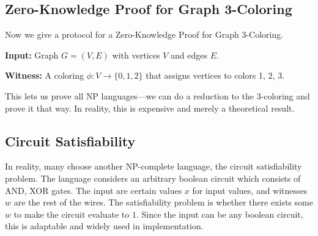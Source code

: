 \subsection{Zero-Knowledge Proof for Graph 3-Coloring}

Now we give a protocol for a Zero-Knowledge Proof for Graph 3-Coloring.

\textbf{Input:} Graph $G = (V, E)$ with vertices $V$ and edges $E$.

\textbf{Witness:} A coloring $\phi : V \to \{0, 1, 2\}$ that assigns vertices to colors 1, 2, 3.


This lets us prove all \textsf{NP} languages---we can do a reduction to the 3-coloring and prove it that way. In reality, this is expensive and merely a theoretical result.

\subsection{Circuit Satisfiability}
In reality, many choose another \textsf{NP}-complete language, the circuit satisfiability problem. The language considers an arbitrary boolean circuit which consists of \textsf{AND}, \textsf{XOR} gates. The input are certain values $x$ for input values, and witnesses $w$ are the rest of the wires. The satisfiability problem is whether there exists some $w$ to make the circuit evaluate to $1$. Since the input can be any boolean circuit, this is adaptable and widely used in implementation.

